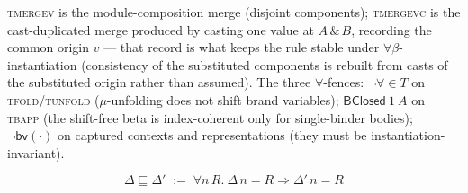 \documentclass[10pt]{article}
\newcommand{\tp}{\varepsilon}
\newcommand{\bra}[1]{\alpha_{#1}}
\newcommand{\subs}[3]{#1[#2{:=}#3]}
\newcommand{\Val}{\mathsf{value}}
\newcommand{\hast}[4]{#1; #2 \vdash #3 : #4}
\newcommand{\storele}{\sqsubseteq}
\newcommand{\bv}[1]{\beta_{#1}}
\newcommand{\allb}[1]{\forall.\,#1}
\newcommand{\blam}[2]{\Lambda_{#1}.\,#2}
\newcommand{\bapp}[2]{#1\,[\bra{#2}]}
\newcommand{\fclosx}[4]{\langle #1, \mu\lambda(#2{\to}#3).\,#4\rangle}
\newcommand{\hbv}[1]{\mathsf{bv}(#1)}
\newcommand{\hallb}[1]{\forall\!\in\!#1}
\newcommand{\bcl}[2]{\mathsf{BClosed}\ #1\ #2}
\begin{document}
\textsc{tmergev} is the module-composition merge (disjoint components);
\textsc{tmergevc} is the cast-duplicated merge produced by casting one value at
$A \,\&\, B$, recording the common origin $v$ — that record is what keeps the rule
stable under $\forall\beta$-instantiation (consistency of the substituted components is
rebuilt from casts of the substituted origin rather than assumed).  The three
$\forall$-fences: $\neg\hallb{T}$ on \textsc{tfold}/\textsc{tunfold} ($\mu$-unfolding
does not shift brand variables); $\bcl{1}{A}$ on \textsc{tbapp} (the shift-free beta is
index-coherent only for single-binder bodies); $\neg\hbv{\cdot}$ on captured contexts
and representations (they must be instantiation-invariant).

\[
\Delta \storele \Delta' \;:=\; \forall n\,R.\ \Delta\,n = R \Rightarrow \Delta'\,n = R
\]
\end{document}
